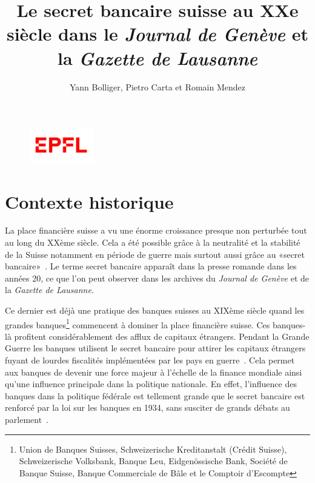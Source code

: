 \documentclass[11pt]{article}
\title{
   Le secret bancaire suisse au XXe siècle dans le
  \textit{Journal de Genève} et la \textit{Gazette de Lausanne}
}
\author{Yann Bolliger, Pietro Carta et Romain Mendez}
\begin{document}
  
\pagestyle{empty}

\begin{figure}
\centering
\includegraphics[width=0.25\textwidth]{logo.png}
\vspace{-1cm}
\end{figure}

\maketitle

\newpage

\pagestyle{fancy}
\section{Contexte historique}

La place financière suisse a vu une énorme croissance presque non perturbée tout
au long du XXème siècle. Cela a été possible grâce à la neutralité et la
stabilité de la Suisse notamment en période de guerre mais surtout aussi grâce
au «secret bancaire»~\citep[p. 512]{Mazbouri12}. 
Le terme secret bancaire apparaît dans la presse romande dans les années 20,
ce que l'on peut observer dans les archives du \textit{Journal de Genève} et 
de la \textit{Gazette de Lausanne}.

Ce dernier est déjà une
pratique des banques suisses au XIXème siècle quand les grandes
banques\footnote{Union de Banques Suisses, Schweizerische Kreditanstalt (Crédit
Suisse), Schweizerische Volksbank, Banque Leu, Eidgenössische Bank, Société de
Banque Suisse, Banque Commerciale de Bâle et le Comptoir d’Escompte} commencent
à dominer la place financière suisse. Ces banques-là profitent considérablement
des afflux de capitaux étrangers. Pendant la Grande Guerre les banques utilisent
le secret bancaire pour attirer les capitaux étrangers fuyant de lourdes
fiscalités implémentées par les pays en guerre~\citep[p. 484-486]{Mazbouri12}.
Cela permet aux banques de devenir une force majeur à l’échelle de la finance
mondiale ainsi qu’une influence principale dans la politique nationale.
En effet, l’influence des banques dans la politique fédérale est tellement
grande que le secret bancaire est renforcé par la loi sur les banques en 1934,
sans susciter de grands débats au parlement~\citep{Guex99}.
\end{document}
